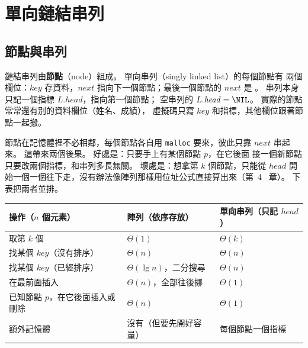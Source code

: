 \section{單向鏈結串列}
\label{sec:ll-singly}

\subsection{節點與串列}

鏈結串列由\textbf{節點}（node）組成。 單向串列（singly linked list）的每個節點有
兩個欄位：$\mathit{key}$ 存資料，$\mathit{next}$ 指向下一個節點；最後一個節點的
$\mathit{next}$ 是 \NIL。 串列本身只記一個指標 $L.\mathit{head}$，指向第一個節點；
空串列的 $L.\mathit{head} = \NIL$。 實際的節點常常還有別的資料欄位（姓名、成績），
虛擬碼只寫 $\mathit{key}$ 和指標，其他欄位跟著節點一起搬。

\begin{center}
\label{fig:ll-singly}
\end{center}

節點在記憶體裡不必相鄰，每個節點各自用 \texttt{malloc} 要來，彼此只靠
$\mathit{next}$ 串起來。 這帶來兩個後果。 好處是：只要手上有某個節點 $p$，在它後面
接一個新節點只要改兩個指標，和串列多長無關。 壞處是：想拿第 $k$ 個節點，只能從
$\mathit{head}$ 開始一個一個往下走，沒有辦法像陣列那樣用位址公式直接算出來（第~4~
章）。 下表把兩者並排。

\begin{center}
\begin{tabular}{lll}
\toprule
操作（$n$ 個元素） & 陣列（依序存放） & 單向串列（只記 $\mathit{head}$） \\
\midrule
取第 $k$ 個 & $\Theta(1)$ & $\Theta(k)$ \\
找某個 $\mathit{key}$（沒有排序） & $\Theta(n)$ & $\Theta(n)$ \\
找某個 $\mathit{key}$（已經排序） & $\Theta(\lg n)$，二分搜尋 & $\Theta(n)$ \\
在最前面插入 & $\Theta(n)$，全部往後挪 & $\Theta(1)$ \\
已知節點 $p$，在它後面插入或刪除 & $\Theta(n)$ & $\Theta(1)$ \\
額外記憶體 & 沒有（但要先開好容量） & 每個節點一個指標 \\
\bottomrule
\end{tabular}
\end{center}

